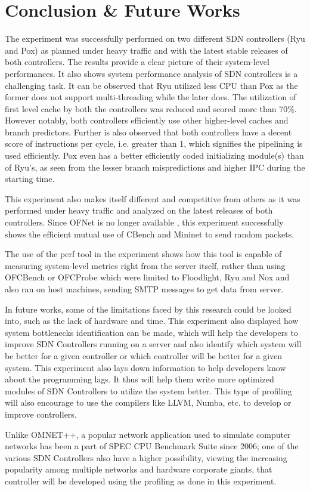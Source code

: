 \chapter{Conclusion \& Future Works} 

The experiment was successfully performed on two different SDN controllers (Ryu and Pox) as planned under heavy traffic and with the latest stable releases of both controllers. The results provide a clear picture of their system-level performances. It also shows system performance analysis of SDN controllers is a challenging task.  It can be observed that Ryu utilized less CPU than Pox as the former does not support multi-threading while the later does. The utilization of first level cache by both the controllers was reduced and scored more than 70\%. However notably, both controllers efficiently use other higher-level caches and branch predictors. Further is also observed that both controllers have a decent score of instructions per cycle, i.e. greater than 1, which signifies the pipelining is used efficiently. Pox even has a better efficiently coded initializing module(s) than of Ryu's, as seen from the lesser branch mispredictions and higher IPC during the starting time.

This experiment also makes itself different and competitive from others as it was performed under heavy traffic and analyzed on the latest releases of both controllers. Since OFNet is no longer available \cite{}, this experiment successfully shows the efficient mutual use of CBench and Mininet to send random packets.

The use of the perf tool in the experiment shows how this tool is capable of measuring system-level metrics right from the server itself, rather than using OFCBench or OFCProbe which were limited to Floodlight, Ryu and Nox and also ran on host machines, sending SMTP messages to get data from server.

In future works, some of the limitations faced by this research could be looked into, such as the lack of hardware and time. This experiment also displayed how system bottlenecks identification can be made, which will help the developers to improve SDN Controllers running on a server and also identify which system will be better for a given controller or which controller will be better for a given system. This experiment also lays down information to help developers know about the programming lags. It thus will help them write more optimized modules of SDN Controllers to utilize the system better. This type of profiling will also encourage to use the compilers like LLVM, Numba, etc. to develop or improve controllers.

Unlike OMNET++, a popular network application used to simulate computer networks has been a part of SPEC CPU Benchmark Suite since 2006; one of the various SDN Controllers also have a higher possibility, viewing the increasing popularity among multiple networks and hardware corporate giants, that controller will be developed using the profiling as done in this experiment.
